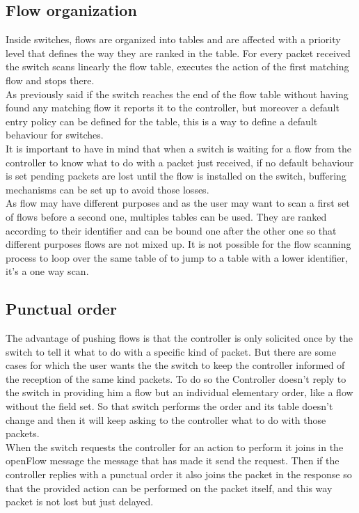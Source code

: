 \documentclass{article}
\begin{document}
\subsection{Flow organization}
Inside switches, flows are organized into tables and are affected with
a priority level that defines the way they are ranked in the
table. For every packet received the switch scans linearly the flow
table, executes the action of the first matching flow and stops there.\\
\newline
As previously said if the switch reaches the end of the flow table
without having found any matching flow it reports it to the
controller, but moreover a default entry policy can be defined for the
table, this is a way to define a default behaviour for switches.\\
\newline
It is important to have in mind that when a switch is waiting for a
flow from the controller to know what to do with a packet just
received, if no default behaviour is set pending packets are lost
until the flow is installed on the switch, buffering mechanisms can
be set up to avoid those losses.\\
\newline
As flow may have different purposes and as the user may want to scan a
first set of flows before a second one, multiples tables can be
used. They are ranked according to their identifier and can be bound
one after the other one so that different purposes flows are not mixed
up. It is not possible for the flow scanning process to loop over the
same table of to jump to a table with a lower identifier, it's a one
way scan.

\subsection{Punctual order}

The advantage of pushing flows is that the controller is only
solicited once by the switch to tell it what to do with a specific
kind of packet. But there are some cases for which the user wants the
the switch to keep the controller informed of the reception of the
same kind packets. To do so the Controller doesn't reply to the switch
in providing him a flow but an individual elementary order, like a
flow without the field set. So that switch performs the order and its
table doesn't change and then it will keep asking to the controller
what to do with those packets.\\
\newline
When the switch requests the controller for an action to perform it
joins in the openFlow message the message that has made it send the
request. Then if the controller replies with a punctual order it also
joins the packet in the response so that the provided action can be
performed on the packet itself, and this way packet is not lost but
just delayed.
\end{document}
